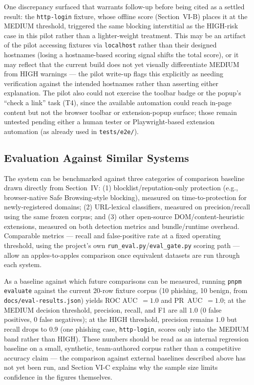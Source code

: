 \documentclass[conference]{IEEEtran}
\begin{document}
One discrepancy surfaced that warrants follow-up before being cited as a settled result: the \texttt{http-login} fixture, whose offline score (Section~VI-B) places it at the MEDIUM threshold, triggered the same blocking interstitial as the HIGH-risk case in this pilot rather than a lighter-weight treatment. This may be an artifact of the pilot accessing fixtures via \texttt{localhost} rather than their designed hostnames (losing a hostname-based scoring signal shifts the total score), or it may reflect that the current build does not yet visually differentiate MEDIUM from HIGH warnings --- the pilot write-up flags this explicitly as needing verification against the intended hostnames rather than asserting either explanation. The pilot also could not exercise the toolbar badge or the popup's ``check a link'' task (T4), since the available automation could reach in-page content but not the browser toolbar or extension-popup surface; those remain untested pending either a human tester or Playwright-based extension automation (as already used in \texttt{tests/e2e/}).

\subsection{Evaluation Against Similar Systems}
The system can be benchmarked against three categories of comparison baseline drawn directly from Section~IV: (1) blocklist/reputation-only protection (e.g., browser-native Safe Browsing-style blocking), measured on time-to-protection for newly-registered domains; (2) URL-lexical classifiers, measured on precision/recall using the same frozen corpus; and (3) other open-source DOM/content-heuristic extensions, measured on both detection metrics and bundle/runtime overhead. Comparable metrics --- recall and false-positive rate at a fixed operating threshold, using the project's own \texttt{run\_eval.py}/\texttt{eval\_gate.py} scoring path --- allow an apples-to-apples comparison once equivalent datasets are run through each system.

As a baseline against which future comparisons can be measured, running \texttt{pnpm evaluate} against the current 20-row fixture corpus (10 phishing, 10 benign, from \texttt{docs/eval-results.json}) yields ROC AUC~$=1.0$ and PR~AUC~$=1.0$; at the MEDIUM decision threshold, precision, recall, and F1 are all $1.0$ (0 false positives, 0 false negatives); at the HIGH threshold, precision remains $1.0$ but recall drops to $0.9$ (one phishing case, \texttt{http-login}, scores only into the MEDIUM band rather than HIGH). These numbers should be read as an internal regression baseline on a small, synthetic, team-authored corpus rather than a competitive accuracy claim --- the comparison against external baselines described above has not yet been run, and Section VI-C explains why the sample size limits confidence in the figures themselves.
\end{document}
